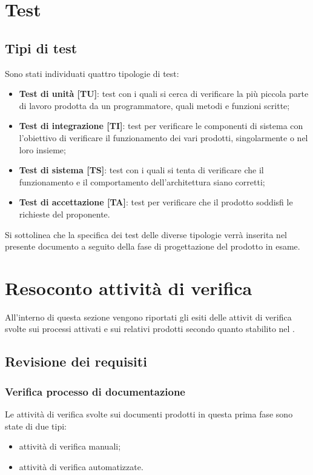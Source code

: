 \newpage
\section{Test}
	\subsection{Tipi di test}
	Sono stati individuati quattro tipologie di test:
	\begin{itemize}
		\item \textbf{Test di unità [TU]}: test con i quali si cerca di verificare la più piccola parte di lavoro prodotta da un programmatore, quali metodi e funzioni scritte;
		\item \textbf{Test di integrazione [TI]}: test per verificare le componenti di sistema con l'obiettivo di verificare il funzionamento dei vari  prodotti, singolarmente o nel loro insieme;
		\item \textbf{Test di sistema [TS]}: test con i quali si tenta di verificare che il funzionamento e il comportamento dell'architettura siano corretti;
		\item \textbf{Test di accettazione [TA]}: test per verificare che il prodotto soddisfi le richieste del proponente.
	\end{itemize}
	Si sottolinea che la specifica dei test delle diverse tipologie verrà inserita nel presente documento a seguito della fase di progettazione del prodotto in esame.

\newpage
\section{Resoconto attività di verifica}
All'interno di questa sezione vengono riportati gli esiti delle attivit di verifica svolte sui processi attivati e sui relativi prodotti secondo quanto stabilito nel \PdP.
	\subsection{Revisione dei requisiti}
		\subsubsection{Verifica processo di documentazione}
		Le attività di verifica svolte sui documenti prodotti in questa prima fase sono state di due tipi:
		\begin{itemize}		
			\item attività di verifica manuali;
			\item attività di verifica automatizzate.
		\end{itemize}
		
